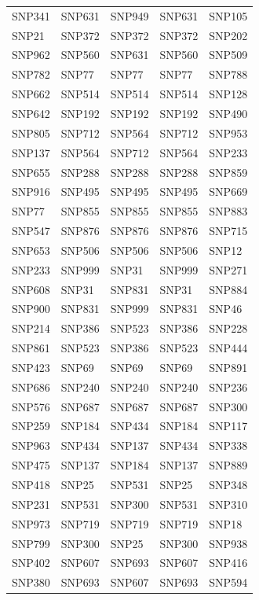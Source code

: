 \begin{table}[ht]
\begin{tabular}{lllll}
  SNP341 & SNP631 & SNP949 & SNP631 & SNP105 \\ 
  SNP21 & SNP372 & SNP372 & SNP372 & SNP202 \\ 
  SNP962 & SNP560 & SNP631 & SNP560 & SNP509 \\ 
  SNP782 & SNP77 & SNP77 & SNP77 & SNP788 \\ 
  SNP662 & SNP514 & SNP514 & SNP514 & SNP128 \\ 
  SNP642 & SNP192 & SNP192 & SNP192 & SNP490 \\ 
  SNP805 & SNP712 & SNP564 & SNP712 & SNP953 \\ 
  SNP137 & SNP564 & SNP712 & SNP564 & SNP233 \\ 
  SNP655 & SNP288 & SNP288 & SNP288 & SNP859 \\ 
  SNP916 & SNP495 & SNP495 & SNP495 & SNP669 \\ 
  SNP77 & SNP855 & SNP855 & SNP855 & SNP883 \\ 
  SNP547 & SNP876 & SNP876 & SNP876 & SNP715 \\ 
  SNP653 & SNP506 & SNP506 & SNP506 & SNP12 \\ 
  SNP233 & SNP999 & SNP31 & SNP999 & SNP271 \\ 
  SNP608 & SNP31 & SNP831 & SNP31 & SNP884 \\ 
  SNP900 & SNP831 & SNP999 & SNP831 & SNP46 \\ 
  SNP214 & SNP386 & SNP523 & SNP386 & SNP228 \\ 
  SNP861 & SNP523 & SNP386 & SNP523 & SNP444 \\ 
  SNP423 & SNP69 & SNP69 & SNP69 & SNP891 \\ 
  SNP686 & SNP240 & SNP240 & SNP240 & SNP236 \\ 
  SNP576 & SNP687 & SNP687 & SNP687 & SNP300 \\ 
  SNP259 & SNP184 & SNP434 & SNP184 & SNP117 \\ 
  SNP963 & SNP434 & SNP137 & SNP434 & SNP338 \\ 
  SNP475 & SNP137 & SNP184 & SNP137 & SNP889 \\ 
  SNP418 & SNP25 & SNP531 & SNP25 & SNP348 \\ 
  SNP231 & SNP531 & SNP300 & SNP531 & SNP310 \\ 
  SNP973 & SNP719 & SNP719 & SNP719 & SNP18 \\ 
  SNP799 & SNP300 & SNP25 & SNP300 & SNP938 \\ 
  SNP402 & SNP607 & SNP693 & SNP607 & SNP416 \\ 
  SNP380 & SNP693 & SNP607 & SNP693 & SNP594 \\ 

\end{tabular}
\end{table}
